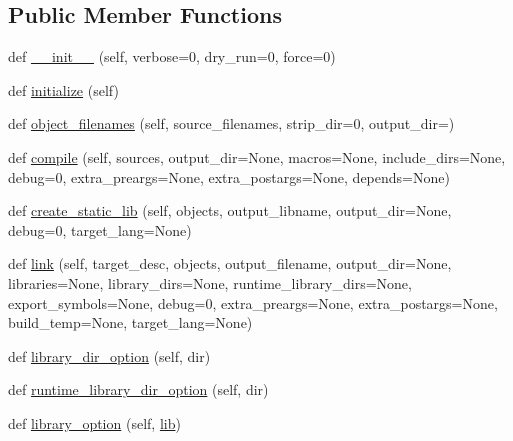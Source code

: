 \subsection*{Public Member Functions}
\begin{DoxyCompactItemize}
\item 
def \hyperlink{classsetuptools_1_1__distutils_1_1msvccompiler_1_1MSVCCompiler_affbbd71d8981e8212a2e174dabf7f856}{\+\_\+\+\_\+init\+\_\+\+\_\+} (self, verbose=0, dry\+\_\+run=0, force=0)
\item 
def \hyperlink{classsetuptools_1_1__distutils_1_1msvccompiler_1_1MSVCCompiler_a71cbd14705de4db2678e8d5ede8e540e}{initialize} (self)
\item 
def \hyperlink{classsetuptools_1_1__distutils_1_1msvccompiler_1_1MSVCCompiler_ad4d065897899e5a1785f8aeed0ce928d}{object\+\_\+filenames} (self, source\+\_\+filenames, strip\+\_\+dir=0, output\+\_\+dir=\textquotesingle{}\textquotesingle{})
\item 
def \hyperlink{classsetuptools_1_1__distutils_1_1msvccompiler_1_1MSVCCompiler_ab6f87459d24ece924175a9f45637d315}{compile} (self, sources, output\+\_\+dir=None, macros=None, include\+\_\+dirs=None, debug=0, extra\+\_\+preargs=None, extra\+\_\+postargs=None, depends=None)
\item 
def \hyperlink{classsetuptools_1_1__distutils_1_1msvccompiler_1_1MSVCCompiler_a6bd955cc3c7c7ed24be80dc604986f92}{create\+\_\+static\+\_\+lib} (self, objects, output\+\_\+libname, output\+\_\+dir=None, debug=0, target\+\_\+lang=None)
\item 
def \hyperlink{classsetuptools_1_1__distutils_1_1msvccompiler_1_1MSVCCompiler_a162d3d446d3a900092ef2b6618392eb0}{link} (self, target\+\_\+desc, objects, output\+\_\+filename, output\+\_\+dir=None, libraries=None, library\+\_\+dirs=None, runtime\+\_\+library\+\_\+dirs=None, export\+\_\+symbols=None, debug=0, extra\+\_\+preargs=None, extra\+\_\+postargs=None, build\+\_\+temp=None, target\+\_\+lang=None)
\item 
def \hyperlink{classsetuptools_1_1__distutils_1_1msvccompiler_1_1MSVCCompiler_a4195a231c99f8ad863aea1df49924d9b}{library\+\_\+dir\+\_\+option} (self, dir)
\item 
def \hyperlink{classsetuptools_1_1__distutils_1_1msvccompiler_1_1MSVCCompiler_a958658ad111cfa67891df32a7c898720}{runtime\+\_\+library\+\_\+dir\+\_\+option} (self, dir)
\item 
def \hyperlink{classsetuptools_1_1__distutils_1_1msvccompiler_1_1MSVCCompiler_a34a0db52ac020af532d3f4a525e03753}{library\+\_\+option} (self, \hyperlink{classsetuptools_1_1__distutils_1_1msvccompiler_1_1MSVCCompiler_a7e2747e3c63e23f78916524512e848f5}{lib})

\end{DoxyCompactItemize}
